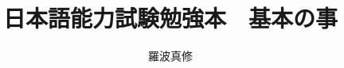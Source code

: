 

\title{日本語能力試験勉強本　基本の事}
\author{羅波真修}


\pagestyle{empty}

\maketitle

\tableofcontents
\thispagestyle{empty}

\pagestyle{headings}



